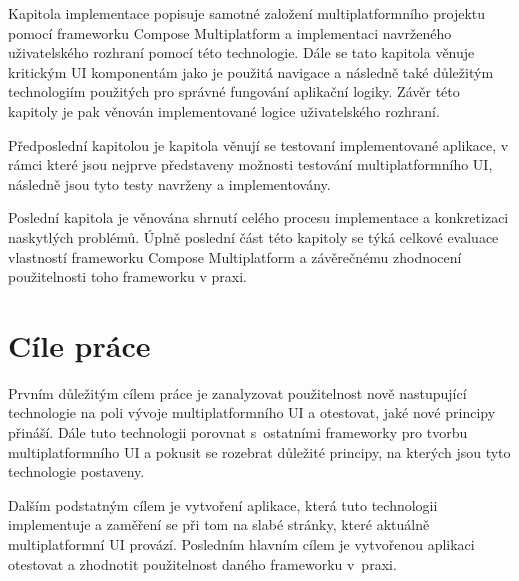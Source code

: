 \medskip

Kapitola implementace popisuje samotné založení multiplatformního projektu pomocí frameworku Compose Multiplatform
a implementaci navrženého uživatelského rozhraní pomocí této technologie. Dále se tato kapitola věnuje kritickým UI komponentám
jako je použitá navigace a následně také důležitým technologiím použitých pro správné fungování aplikační logiky. Závěr této kapitoly
je pak věnován implementované logice uživatelského rozhraní.

\medskip

Předposlední kapitolou je kapitola věnují se testovaní implementované aplikace, v rámci které jsou nejprve představeny možnosti testování
multiplatformního UI, následně jsou tyto testy navrženy a implementovány.


\medskip


Poslední kapitola je věnována shrnutí celého procesu implementace a konkretizaci naskytlých problémů. Úplně poslední část této kapitoly se týká celkové evaluace
vlastností frameworku Compose Multiplatform a závěrečnému zhodnocení použitelnosti toho frameworku v praxi.

\newpage

\section{Cíle práce} \label{goals}
Prvním důležitým cílem práce je zanalyzovat použitelnost nově nastupující technologie na poli vývoje multiplatformního UI a otestovat, jaké
nové principy přináší. Dále tuto technologii porovnat s~ostatními frameworky pro tvorbu multiplatformního UI a pokusit se
rozebrat důležité principy, na kterých jsou tyto technologie postaveny. 

Dalším podstatným cílem je vytvoření aplikace, která tuto technologii implementuje a zaměření se při tom na slabé stránky, 
které aktuálně multiplatformní UI provází. 
Posledním hlavním cílem je vytvořenou aplikaci otestovat a zhodnotit použitelnost daného frameworku v~praxi.

